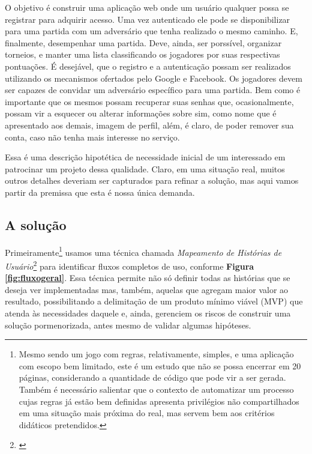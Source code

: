       O objetivo é construir uma aplicação web onde um usuário qualquer possa se
      registrar para adquirir acesso. Uma vez autenticado ele pode se
      disponibilizar para uma partida com um adversário que tenha realizado o
      mesmo caminho. E, finalmente, desempenhar uma partida. Deve, ainda, ser
      porssível, organizar torneios, e manter uma lista classificando os
      jogadores por suas respectivas pontuações. É desejável, que o registro e a
      autenticação possam ser realizados utilizando os mecanismos ofertados pelo
      Google e Facebook. Os jogadores devem ser capazes de convidar um
      adversário específico para uma partida. Bem como é importante que os
      mesmos possam recuperar suas senhas que, ocasionalmente, possam vir a
      esquecer ou alterar informações sobre sim, como nome que é apresentado aos
      demais, imagem de perfil, além, é claro, de poder remover sua conta, caso
      não tenha mais interesse no serviço.

      Essa é uma descrição hipotética de necessidade inicial de um interessado
      em patrocinar um projeto dessa qualidade. Claro, em uma situação real,
      muitos outros detalhes deveriam ser capturados para refinar a solução, mas
      aqui vamos partir da premissa que esta é nossa única demanda.


    \subsection{A solução}

      Primeiramente\footnote{Mesmo sendo um jogo com regras, relativamente,
      simples, e uma aplicação com escopo bem limitado, este é um estudo que não
      se possa encerrar em 20 páginas, considerando a quantidade de código que
      pode vir a ser gerada. Também é necessário salientar que o contexto de
      automatizar um processo cujas regras já estão bem definidas apresenta
      privilégios não compartilhados em uma situação mais próxima do real, mas
      servem bem aos critérios didáticos pretendidos.}
      usamos uma técnica chamada
      \emph{Mapeamento de Histórias de Usuário}\footnote{\cite{Patton2014}}
      para identificar fluxos completos de uso, conforme
      \textbf{Figura \ref{fig:fluxogeral}}. Essa técnica permite não só definir
      todas as histórias que se deseja ver implementadas mas, também, aquelas
      que agregam maior valor ao resultado, possibilitando a delimitação de um
      produto mínimo viável (MVP) que atenda às necessidades daquele e, ainda,
      gerenciem os riscos de construir uma solução pormenorizada, antes mesmo de
      validar algumas hipóteses.

